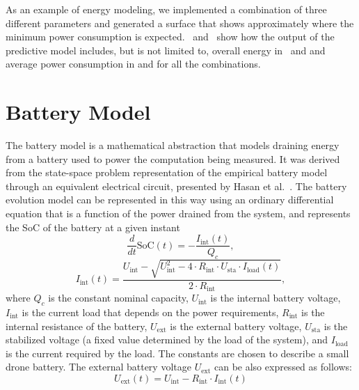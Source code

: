 As an example of energy modeling, we implemented a combination of three different parameters and generated a surface that shows approximately where the minimum power consumption is expected. ~and~ show how the output of the predictive model includes, but is not limited to, overall energy in~ and  and average power consumption in  and  for all the combinations. 

\section{\color{cyan}Battery Model}

The battery model is a mathematical abstraction that models draining energy from a battery used to power the computation being measured. It was derived from the state-space problem representation of the empirical battery model through an equivalent electrical circuit, presented by Hasan et al.~\cite{hasan2018exogenous}. The battery evolution model can be represented in this way using an ordinary differential equation that is a function of the power drained from the system, and represents the SoC of the battery at a given instant
\begin{equation}\label{eq:battery-model-1}
  \frac{d}{dt}\mathrm{SoC}(t)=-\frac{I_\mathrm{int}(t)}{Q_c},
\end{equation}
\begin{equation}\label{eq:battery-model-2}
  I_\mathrm{int}(t)=
    \frac{U_\mathrm{int}-
    \sqrt{
      U_\mathrm{int}^2-
      4\cdot R_{\mathrm{int}}\cdot U_\mathrm{sta}\cdot I_{\mathrm{load}}(t)}
    }{2\cdot R_\mathrm{int}},
\end{equation}
where $Q_c$ is the constant nominal capacity, $U_\mathrm{int}$ is the internal battery voltage, $I_\mathrm{int}$ is the current load that depends on the power requirements, $R_\mathrm{int}$ is the internal resistance of the battery, $U_\mathrm{ext}$ is the external battery voltage, $U_{\mathrm{sta}}$ is the stabilized voltage (a fixed value determined by the load of the system), and $I_\mathrm{load}$ is the current required by the load. The constants are chosen to describe a small drone battery. The external battery voltage $U_{\mathrm{ext}}$ can be also expressed as follows:
\begin{equation}
U_{\mathrm{ext}}(t)=U_{\mathrm{int}}-R_{\mathrm{int}}\cdot I_{\mathrm{int}}(t)
\end{equation}

